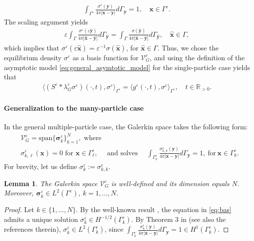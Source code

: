 \documentclass[]{article}
\newtheorem{lemma}{Lemma}
\numberwithin{equation}{section}
\numberwithin{theorem}{section}
\numberwithin{lemma}{section}
\numberwithin{corollary}{section}
\numberwithin{proposition}{section}
\numberwithin{definition}{section}
\newcommand{\bx}{\boldsymbol{x}}
\newcommand{\bsigma}{\boldsymbol{\sigma}}
\newcommand{\re}{\varepsilon}
\renewcommand{\vec}{\boldsymbol}
\begin{document}
	\begin{align*}%
		\int_{\Gamma^{\re}} \frac{\sigma^{\re}(\boldsymbol{y})}{4\pi |\boldsymbol{x} - \boldsymbol{y}|} d\Gamma_{\boldsymbol{y}} = 1, \quad \boldsymbol{x} \in \Gamma^{\re}.
	\end{align*}
	The scaling argument yields  
	\begin{align}
		\label{eq:scarg}
		\re \int_{\Gamma} \frac{\sigma^{\re}(\re \hat{\boldsymbol{y}})}{4\pi |\hat{\boldsymbol{x}} - \hat{\boldsymbol{y}}|}  d \Gamma_{\hat{\boldsymbol{y}}}= \int_{\Gamma} \frac{\sigma(\hat{\boldsymbol{y}})}{4\pi| \hat{\boldsymbol{x}} - \hat{\boldsymbol{y}} |} d \Gamma_{\hat{\boldsymbol{y}}}, \quad  \hat{\boldsymbol{x}} \in \Gamma,
	\end{align}
	which implies that $ \sigma^{\re}(\re \hat{\boldsymbol{x}}) = \re^{-1} \sigma(\hat{\boldsymbol{x}})  $, for $\hat{\boldsymbol{x}}  \in \Gamma$.
	Thus, we chose the equilibrium density $\sigma^{\re}$ as a basis function for $\mathcal{V}^{\re}_G$, and using the definition of the asymptotic model \eqref{eq:general_asymtotic_model} for the single-particle case yields that
	\begin{align*}%
		\langle (S^{\re} * \lambda^{\re}_G \sigma^{\re}) (\cdot, t) , \sigma^{\re} \rangle_{\Gamma^{\re}} = \langle g^{\re}(\cdot,t), \sigma^{\re} \rangle_{\Gamma^{\re}}, \quad t \in \mathbb{R}_{>0}.
	\end{align*}
	\paragraph{Generalization to the many-particle case}  In the general multiple-particle case, the Galerkin space takes the following form:
	\begin{align}%
		\nonumber
		&\mathcal{V}^{\re}_G = \text{span} \{ \bsigma^{\re}_k \}_{k=1}^N, \text{ where }\\
		\label{eq:bas}
		&\sigma^{\re}_{k,\ell}(\vec{x})=0 \text{ for }\vec{x}\in \Gamma^{\re}_{\ell},  \quad	\text{ and solves }\quad \int_{\Gamma_k^{\re}} \frac{\sigma^{\re}_{k,k}(\boldsymbol{y})}{4 \pi |\boldsymbol{x} - \boldsymbol{y}|} d\Gamma_{\boldsymbol{y}}=1,~\text{for}~ \bx \in \Gamma_k^{\re}.
	\end{align}
	For brevity, let us define $	\sigma_k^{\re}:=\sigma_{k,k}^{\re}$. 
	\begin{lemma}
		\label{lemma:Galerkin_space}
		The Galerkin space $\mathcal{V}^{\re}_G$ is well-defined and its dimension equals $N$. Moreover, $\boldsymbol{\sigma}_k^{\re}\in L^2(\Gamma^\re)$, $k=1, \ldots, N$. 
	\end{lemma}
	\begin{proof}
		Let $k \in \{1, \ldots, N \}$. By the well-known result \cite[Corollary 8.13]{mclean}, the equation in \eqref{eq:bas} admits a unique solution $\sigma^{\re}_{k}\in H^{-1/2}(\Gamma^{\re}_k)$. By Theorem 3 in \cite{costabel} (see also the references therein), $\sigma^{\re}_{k} \in L^2(\Gamma^{\re}_k)$, since $\int_{\Gamma^{\re}_k} \frac{\sigma^{\re}_{k}(\boldsymbol{y})}{4\pi |\boldsymbol{x} - \boldsymbol{y}|} d\Gamma_{\boldsymbol{y}} = 1 \in H^{1}(\Gamma^{\re}_k)$.
	\end{proof}
	
\end{document}

